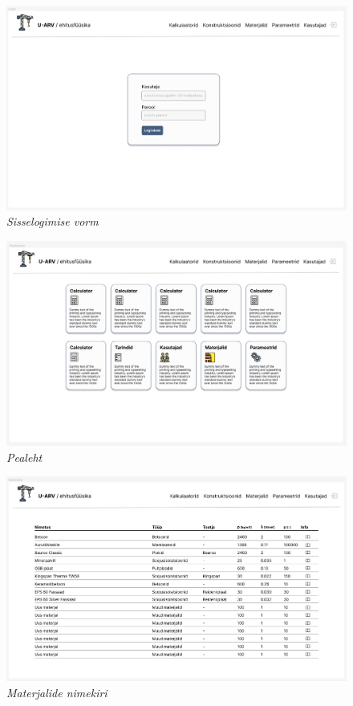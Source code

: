 \begin{figure}[ht]
    \centering
    \includegraphics[width=.9\textwidth]{figures/interface_desing/ap_desing_login.png}
    \caption[Kasutajaliidese disaain: sisselogimise vorm]{\textit{Sisselogimise vorm}}
    \label{fig:interface_design_login}
\end{figure}
\begin{figure}[ht]
    \centering
    \includegraphics[width=.9\textwidth]{figures/interface_desing/ap_desing_dashboard.png}
    \caption[Kasutajaliidese disaain: pealeht]{\textit{Pealeht}}
    \label{fig:interface_design_dashboard}
\end{figure}
\begin{figure}[ht]
    \centering
    \includegraphics[width=.9\textwidth]{figures/interface_desing/ap_desing_materials.png}
    \caption[Kasutajaliidese disaain: materjalide nimekiri]{\textit{Materjalide nimekiri}}
    \label{fig:interface_design_materials}
\end{figure}
